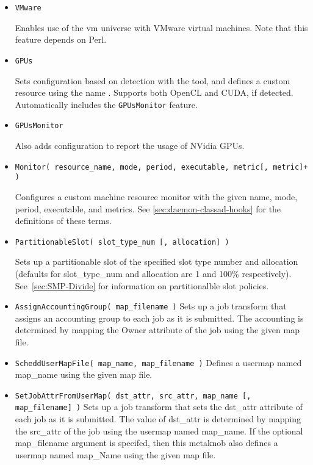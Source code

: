 \begin{description}
\begin{itemize}
    \item \texttt{VMware}

    Enables use of the vm universe with VMware virtual machines.
    Note that this feature depends on Perl. 

    \item \texttt{GPUs}

    Sets configuration based on detection with the 
    tool, and defines a custom resource using the name .
    Supports both OpenCL and CUDA, if detected.  Automatically includes
    the \texttt{GPUsMonitor} feature.

    \item \texttt{GPUsMonitor}

    Also adds configuration to report the usage of NVidia GPUs.

    \item \texttt{Monitor( resource\_name, mode, period, executable, metric[, metric]+ )}

    Configures a custom machine resource monitor with the given name, mode,
    period, executable, and metrics.  See \ref{sec:daemon-classad-hooks}
    for the definitions of these terms.

    \item \texttt{PartitionableSlot( slot\_type\_num [, allocation] )}

   	Sets up a partitionable slot of the specified slot type number
	and allocation (defaults for slot\_type\_num and allocation
	are 1 and 100\% respectively).
	See~\ref{sec:SMP-Divide} for information on partitionalble
	slot policies.
	
    \item \texttt{AssignAccountingGroup( map\_filename )}
	Sets up a  job transform that assigns an accounting group to
	each job as it is submitted. The accounting is determined by mapping the
	Owner attribute of the job using the given map file.

    \item \texttt{ScheddUserMapFile( map\_name, map\_filename )}
	Defines a  usermap named map\_name using the given map file.

    \item \texttt{SetJobAttrFromUserMap( dst\_attr, src\_attr, map\_name [, map\_filename] )}
	Sets up a  job transform that sets the dst\_attr attribute of each job
	as it is submitted. The value of dst\_attr is determined by mapping the src\_attr of the job
	using the usermap named map\_name.  If the optional map\_filename argument is specifed, then
	this metaknob also defines a  usermap named map\_Name using the given map file.


\end{itemize}
\end{description}
